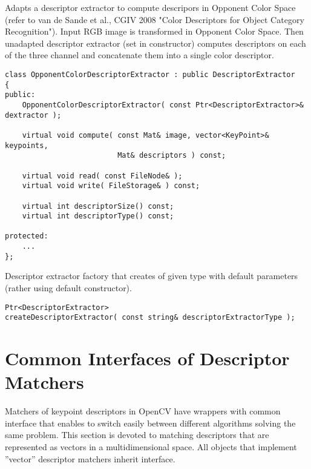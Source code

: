 Adapts a descriptor extractor to compute descripors in Opponent Color Space
(refer to van de Sande et al., CGIV 2008 "Color Descriptors for Object Category Recognition").
Input RGB image is transformed in Opponent Color Space. Then unadapted descriptor extractor
(set in constructor) computes descriptors on each of the three channel and concatenate
them into a single color descriptor.

\begin{lstlisting}
class OpponentColorDescriptorExtractor : public DescriptorExtractor
{
public:
    OpponentColorDescriptorExtractor( const Ptr<DescriptorExtractor>& dextractor );

    virtual void compute( const Mat& image, vector<KeyPoint>& keypoints, 
                          Mat& descriptors ) const;

    virtual void read( const FileNode& );
    virtual void write( FileStorage& ) const;

    virtual int descriptorSize() const;
    virtual int descriptorType() const;

protected:
    ...
};
\end{lstlisting}

Descriptor extractor factory that creates  of given type with 
default parameters (rather using default constructor).

\begin{lstlisting}
Ptr<DescriptorExtractor> 
createDescriptorExtractor( const string& descriptorExtractorType );
\end{lstlisting}

\begin{description}
\end{description}


\section{Common Interfaces of Descriptor Matchers}
Matchers of keypoint descriptors in OpenCV have wrappers with common interface that enables to switch easily 
between different algorithms solving the same problem. This section is devoted to matching descriptors 
that are represented as vectors in a multidimensional space. All objects that implement ''vector'' 
descriptor matchers inherit  interface.

